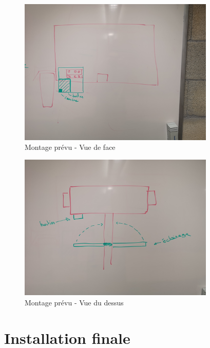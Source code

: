 \begin{figure}[H]
    \centering
    \includegraphics[height=7cm]{assets/figures/montage2.jpg}
    \caption{Montage prévu - Vue de face}
\end{figure}

\begin{figure}[H]
    \centering
    \includegraphics[height=7cm]{assets/figures/montage3.jpg}
    \caption{Montage prévu - Vue du dessus}
\end{figure}
\section{Installation finale}